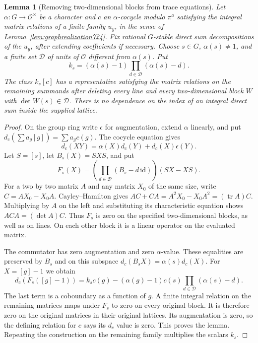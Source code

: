 \documentclass[a4paper,11pt]{article}
\newtheorem{lemma}[proposition]{Lemma}
\theoremstyle{definition}
\theoremstyle{remark}
\numberwithin{equation}{section}
\begin{document}
\begin{lemma}[Removing two-dimensional blocks from trace equations]
\leavevmode\label{lem:twoblocks754}
Let \(\alpha:G\to\mathcal O^\times\) be a character and \(c\) an
\(\alpha\)-cocycle modulo \(\pi^a\) satisfying the integral
matrix relations of a finite family \(u_y\), in the sense of
Lemma~\ref{lem:graphrealization724}. Fix rational
\(G\)-stable direct sum decompositions of the \(u_y\), after
extending coefficients if necessary. Choose \(s\in G\),
\(\alpha(s)\ne1\), and a finite set \(\mathcal D\) of units of
\(\mathcal O\) different from \(\alpha(s)\). Put
\[
                k_s=(\alpha(s)-1)
                        \prod_{d\in\mathcal D}(\alpha(s)-d).
\]
The class \(k_s[c]\) has a representative satisfying the matrix
relations on the remaining summands after deleting every line
and every two-dimensional block \(W\) with
\(\det W(s)\in\mathcal D\). There is no dependence on the index
of an integral direct sum inside the supplied lattice.
\end{lemma}
\begin{proof}
On the group ring write \(\epsilon\) for augmentation, extend
\(\alpha\) linearly, and put \(d_c(\sum a_g[g])=\sum a_g c(g)\).
The cocycle equation gives
\[
      d_c(XY)=\alpha(X)d_c(Y)+d_c(X)\epsilon(Y).
\]
Let \(S=[s]\), let \(B_s(X)=SXS\), and put
\[
   F_s(X)=
      \left(\prod_{d\in\mathcal D}(B_s-d\,\mathrm{id})\right)
                     (SX-XS).
\]
For a two by two matrix \(A\) and any matrix \(X_0\) of the
same size, write \(C=AX_0-X_0A\). Cayley--Hamilton gives
\(AC+CA=A^2X_0-X_0A^2=(\operatorname{tr}A)C\).
Multiplying by \(A\) on the left and substituting its
characteristic equation shows \(ACA=(\det A)C\). Thus
\(F_s\) is zero on the specified two-dimensional blocks, as
well as on lines. On each other block it is a linear operator
on the evaluated matrix.

The commutator has zero augmentation and zero \(\alpha\)-value.
These equalities are preserved by \(B_s\) and on this subspace
\(d_c(B_sX)=\alpha(s)d_c(X)\). For \(X=[g]-1\) we obtain
\[
 d_c(F_s([g]-1))
 = k_s c(g)-
    (\alpha(g)-1)c(s)\prod_{d\in\mathcal D}(\alpha(s)-d).
\]
The last term is a coboundary as a function of \(g\). A finite
integral relation on the remaining matrices maps under \(F_s\)
to zero on every original block. It is therefore zero on the
original matrices in their original lattices. Its augmentation
is zero, so the defining relation for \(c\) says its \(d_c\)
value is zero. This proves the lemma. Repeating the construction
on the remaining family multiplies the scalars \(k_s\).
\end{proof}
\end{document}

